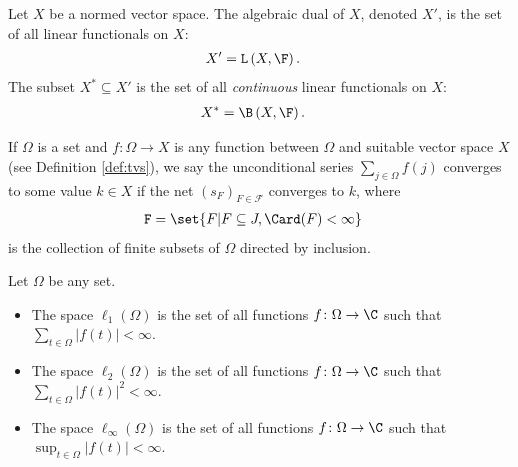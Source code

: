 \begin{definition}
  Let $X$ be a normed vector space. The algebraic dual of $X$, denoted $X'$, is the set of all linear functionals on $X$:
  \begin{align*}
    X' &= \mathcal{L}\left(X,\F\right).
  \end{align*}
  The subset $X^{\ast}\subseteq X'$ is the set of all \textit{continuous} linear functionals on $X$:
  \begin{align*}
    X^{\ast} &= \B\left(X,\F\right).
  \end{align*}
\end{definition}
\begin{definition}
  If $\Omega$ is a set and $f\colon \Omega\rightarrow X$ is any function between $\Omega$ and suitable vector space $X$ (see Definition \ref{def:tvs}), we say the unconditional series $\sum_{j\in\Omega}f(j)$ converges to some value $k\in X$ if the net $\left(s_{F}\right)_{F\in \mathcal{F}}$ converges to $k$, where
  \begin{align*}
    \mathcal{F} &= \set{F | F\subseteq J,\Card(F) < \infty}
  \end{align*}
  is the collection of finite subsets of $\Omega$ directed by inclusion.
\end{definition}
\begin{definition}\label{def:three_function_spaces}
  Let $\Omega$ be any set.
  \begin{itemize}
    \item The space $\ell_{1}(\Omega)$ is the set of all functions $f\colon \Omega\rightarrow \C$ such that $\displaystyle \sum_{t\in\Omega}\left\vert f(t) \right\vert < \infty$.
    \item The space $\ell_{2}(\Omega)$ is the set of all functions $f\colon \Omega\rightarrow \C$ such that $\displaystyle \sum_{t\in\Omega}\left\vert f(t) \right\vert^2 < \infty$.
    \item The space $\ell_{\infty}(\Omega)$ is the set of all functions $f\colon \Omega\rightarrow \C$ such that $\sup_{t\in\Omega}\left\vert f(t) \right\vert < \infty$.
  \end{itemize}
\end{definition}

